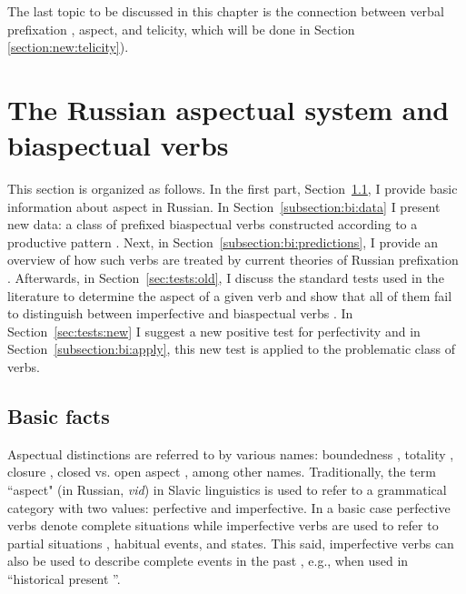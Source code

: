 The last topic to be discussed in this chapter is the connection between verbal prefixation , aspect, and telicity, which will be done in Section \ref{section:new:telicity}). 


\section{The Russian aspectual system and biaspectual verbs }\label{section:new:biaspectual}
This section is organized as follows. In the first part, Section~\ref{subsection:basic}, I provide basic information about aspect in Russian.  In Section~\ref{subsection:bi:data} I present new data: a class of prefixed biaspectual verbs  constructed according to a productive pattern  . Next, in Section~\ref{subsection:bi:predictions}, I provide an overview of how such verbs are treated by current theories of Russian prefixation . Afterwards, in Section~\ref{sec:tests:old}, I discuss the standard tests used in the literature to determine the aspect  of a given verb and show that all of them fail to distinguish between imperfective and biaspectual verbs . In Section~\ref{sec:tests:new} I suggest a new positive test for perfectivity  and in Section~\ref{subsection:bi:apply}, this new test is applied to the problematic class of verbs.

\subsection{Basic facts}\label{subsection:basic}
Aspectual distinctions  are referred to by various names: boundedness \citep{Avilova:76, Jakobson:57, Paducheva:96, Talmy:00}, totality \citep{Forsyth:70, Bondarko:71, Comrie:76, Dickey:00, Maslov:65}, closure \citep{Timberlake:82}, closed vs. open aspect \citep{Janda:07a}, among other names. Traditionally, the term ``aspect" (in Russian, \textit{vid}) in Slavic linguistics is used to refer to a grammatical category with two values: perfective and imperfective. In a basic case perfective verbs  denote complete situations  while imperfective verbs  are used to refer to partial situations , habitual events, and states. This said, imperfective verbs  can also be used to describe complete events in the past , e.g., when used in ``historical present ''. 

